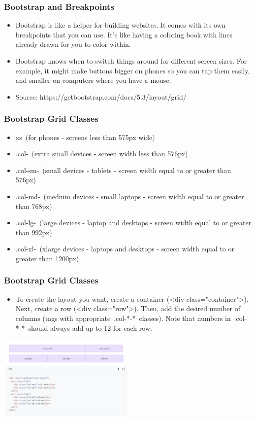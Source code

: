 \documentclass[aspectratio=169, table]{beamer}
\begin{document}
\begin{frame}[fragile]
	\frametitle{Bootstrap and Breakpoints}
	\vskip0cm
	 \begin{itemize}
        \item Bootstrap is like a helper for building websites. It comes with its own breakpoints that you can use. It's like having a coloring book with lines already drawn for you to color within.
	\item Bootstrap knows when to switch things around for different screen sizes. For example, it might make buttons bigger on phones so you can tap them easily, and smaller on computers where you have a mouse.
	\item Source: https://getbootstrap.com/docs/5.3/layout/grid/
   	 \end{itemize}
\end{frame}

\begin{frame}[fragile]
	\frametitle{Bootstrap Grid Classes}
	\vskip1cm
	 \begin{itemize}
        \item xs (for phones - screens less than 575px wide)
	\item .col- (extra small devices - screen width less than 576px)
	\item .col-sm- (small devices - tablets - screen width equal to or greater than 576px)
	\item .col-md- (medium devices - small laptops - screen width equal to or greater than 768px)
	\item .col-lg- (large devices - laptop and desktops - screen width equal to or greater than 992px)
	\item .col-xl- (xlarge devices - laptops and desktops - screen width equal to or greater than 1200px)
   	 \end{itemize}
\end{frame}

\begin{frame}[fragile]
	\frametitle{Bootstrap Grid Classes}
	\vskip1.5cm
	 \begin{itemize}
        \item To create the layout you want, create a container (<div class="container">). Next, create a row (<div class="row">). Then, add the desired number of columns (tags with appropriate .col-*-* classes). Note that numbers in .col-*-* should always add up to 12 for each row.
   	 \end{itemize}
	\begin{center}
		\includegraphics[width=0.5\textwidth]{classFiles/bootstrap-grid.jpg}
	\end{center}
\end{frame}
\end{document}
